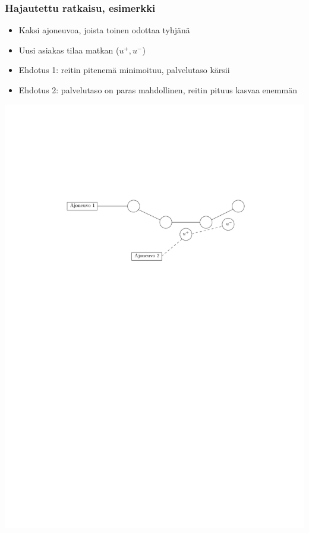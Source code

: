 \documentclass{beamer}
\begin{document}
  
                          \begin{frame}
  \frametitle{Hajautettu ratkaisu, esimerkki}   %
\begin{minipage}[t][0.3\textheight][t]{\textwidth}
  \begin{itemize}
 \item 
 Kaksi ajoneuvoa, joista toinen odottaa tyhjänä
   \item 
 Uusi asiakas tilaa matkan ($u^+,u^-$)
 \item
 Ehdotus 1: reitin pitenemä minimoituu, palvelutaso kärsii
  \item
 Ehdotus 2: palvelutaso on paras mahdollinen, reitin pituus kasvaa enemmän
\end{itemize}
  \end{minipage}
  \vfill
  \begin{minipage}{\textwidth}
    \centering
\includegraphics[scale=0.6]{valinta04}
  \end{minipage}
  
  \end{frame}
    
\end{document}
